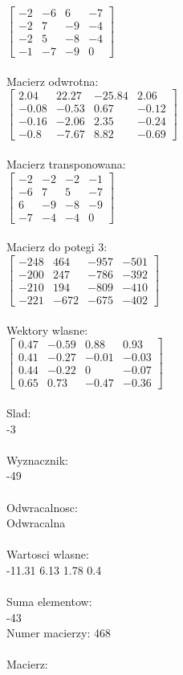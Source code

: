 \documentclass[a4paper,12pt]{article}
\begin{document}
$\begin{bmatrix} -2&-6&6&-7\\-2&7&-9&-4\\-2&5&-8&-4\\-1&-7&-9&0 \end{bmatrix}$
\\
\\
Macierz odwrotna:\\

$\begin{bmatrix} 2.04&22.27&-25.84&2.06\\-0.08&-0.53&0.67&-0.12\\-0.16&-2.06&2.35&-0.24\\-0.8&-7.67&8.82&-0.69 \end{bmatrix}$
\\
\\
Macierz transponowana:\\

$\begin{bmatrix} -2&-2&-2&-1\\-6&7&5&-7\\6&-9&-8&-9\\-7&-4&-4&0 \end{bmatrix}$
\\
\\
Macierz do potegi 3:\\

$\begin{bmatrix} -248&464&-957&-501\\-200&247&-786&-392\\-210&194&-809&-410\\-221&-672&-675&-402 \end{bmatrix}$
\\
\\
Wektory wlasne:\\

$\begin{bmatrix} 0.47&-0.59&0.88&0.93\\0.41&-0.27&-0.01&-0.03\\0.44&-0.22&0&-0.07\\0.65&0.73&-0.47&-0.36 \end{bmatrix}$
\\
\\
Slad:\\
-3
\\
\\
Wyznacznik:\\
-49
\\
\\
Odwracalnosc:\\
Odwracalna
\\
\\
Wartosci wlasne:\\
-11.31 6.13 1.78 0.4
\\
\\
Suma elementow:\\
-43
\\
\newpage
Numer macierzy:
468
\\
\\
Macierz:\\
\end{document}
